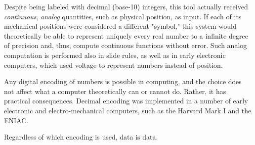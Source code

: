 \begin{tcolorbox}[breakable, enhanced, colback=textbook-blue, sharp corners]
	Despite being labeled with decimal (base-10) integers, this tool actually received \textit{continuous}, \textit{analog} quantities, such as physical position, as input. If each of its mechanical positions were considered a different "symbol," this system would theoretically be able to represent uniquely every real number to a infinite degree of precision and, thus, compute continuous functions without error. Such analog computation is performed also in slide rules, as well as in early electronic computers, which used voltage to represent numbers instead of position. \\
	
	\begin{center}
	\end{center}
	
	
	Any digital encoding of numbers is possible in computing, and the choice does not affect what a computer theoretically can or cannot do. Rather, it has practical consequences. Decimal encoding was implemented in a number of early electronic and electro-mechanical computers, such as the Harvard Mark I and the ENIAC. 
	
	
	
	\vspace{3mm}
\end{tcolorbox}
\vspace{2\baselineskip}



Regardless of which encoding is used, data is data.

